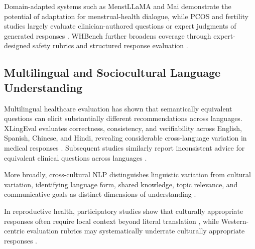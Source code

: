 Domain-adapted systems such as MenstLLaMA \citep{adhikary-etal-2025-menstrual} and Mai \citep{mughal-etal-2025-mai} demonstrate the potential of adaptation for menstrual-health dialogue, while PCOS and fertility studies largely evaluate clinician-authored questions or expert judgments of generated responses \citep{devranoglu-etal-2024-chatgpt,graca-etal-2026-assessing,chervenak-etal-2023-promise,gely-etal-2026-large}. WHBench further broadens coverage through expert-designed safety rubrics and structured response evaluation \citep{maurya-etal-2026-whbench}.





\subsection{Multilingual and Sociocultural Language Understanding}

Multilingual healthcare evaluation has shown that semantically equivalent
questions can elicit substantially different recommendations across
languages.
XLingEval evaluates correctness, consistency, and verifiability across
English, Spanish, Chinese, and Hindi, revealing considerable cross-language
variation in medical responses
\citep{jin-etal-2024-better}.
Subsequent studies similarly report inconsistent advice for equivalent
clinical questions across languages
\citep{schlicht-etal-2025-consistent}.

More broadly, cross-cultural NLP distinguishes linguistic variation from
cultural variation, identifying language form, shared knowledge, topic
relevance, and communicative goals as distinct dimensions of understanding
\citep{hershcovich-etal-2022-challenges,
adilazuarda-etal-2024-towards}.

In reproductive health, participatory studies show that culturally
appropriate responses often require local context beyond literal translation
\citep{deva-etal-2025-family}, while Western-centric evaluation rubrics may
systematically underrate culturally appropriate responses
\citep{dey-etal-2025-beyond}.

